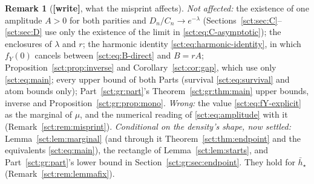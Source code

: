 \documentclass[11pt,letterpaper]{article}
\theoremstyle{definition}\newtheorem{remark}[theorem]{Remark}
\newcommand{\fY}{f_Y}\newcommand{\code}[1]{\texttt{#1}}
\newcommand{\hstar}{\bar h_\star}\newcommand{\fstar}{f_\star}\newcommand{\Kstar}{K_\star}
\newcommand{\wtag}{\textup{\textbf{[write]}}}
\begin{document}
\begin{remark}[\wtag, what the misprint affects]\label{sct:rem:scope}
\emph{Not affected:} the existence of one amplitude $A>0$ for both parities and $D_n/C_n\to e^{-\lambda}$ (Sections~\ref{sct:sec:C}--\ref{sct:sec:D} use only the existence of the limit in \eqref{sct:eq:C-asymptotic}); the enclosures of $\lambda$ and $r$; the harmonic identity \eqref{sct:eq:harmonic-identity}, in which $\fY(0)$ cancels between \eqref{sct:eq:B-direct} and $B=rA$; Proposition~\ref{sct:prop:inverse} and Corollary~\ref{sct:cor:gap}, which use only \eqref{sct:eq:main}; every upper bound of both Parts (survival \eqref{sct:eq:survival} and atom bounds only); Part~\ref{sct:gr:part}'s Theorem~\ref{sct:gr:thm:main} upper bounds, inverse and Proposition~\ref{sct:gr:prop:mono}. \emph{Wrong:} the value \eqref{sct:eq:fY-explicit} as the marginal of $\mu$, and the numerical reading of \eqref{sct:eq:amplitude} with it (Remark~\ref{sct:rem:misprint}). \emph{Conditional on the density's shape, now settled:} Lemma~\ref{sct:lem:marginal} (and through it Theorem~\ref{sct:thm:endpoint} and the equivalents \eqref{sct:eq:main}), the rectangle of Lemma~\ref{sct:lem:starts}, and Part~\ref{sct:gr:part}'s lower bound in Section~\ref{sct:gr:sec:endpoint}. They hold for $\hstar$ (Remark~\ref{sct:rem:lemmafix}).


\end{remark}
\end{document}
